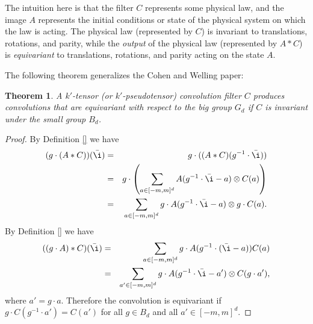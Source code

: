 \documentclass{article}
\theoremstyle{plain}
\newtheorem{theorem}{Theorem}
\begin{document}
The intuition here is that the filter $C$ represents some physical law, and the image $A$ represents the initial conditions or state of the physical system on which the law is acting.
The physical law (represented by $C$) is invariant to translations, rotations, and parity, while the \emph{output} of the physical law (represented by $A\ast C$) is \emph{equivariant} to translations, rotations, and parity acting on the state $A$.

The following theorem generalizes the Cohen and Welling paper:

\begin{theorem}
A $k'$-tensor (or $k'$-pseudotensor) convolution filter $C$ produces convolutions that are equivariant with respect to the big group $G_d$ if $C$ is invariant under the small group $B_d$.
\end{theorem}

\begin{proof}
By Definition \ref{} we have
\begin{eqnarray}
(g\cdot (A* C) )(\bar \i) &=& g\cdot( (A*C)(g^{-1} \cdot \bar \i)) \\
&=& g \cdot \left (\sum_{a\in [-m,m]^d} A(g^{-1}\cdot \bar \i - a) \otimes C(a)\right)\\
&=& \sum_{a\in [-m,m]^d} g \cdot A(g^{-1} \cdot \bar \i -a ) \otimes g \cdot C(a).
\end{eqnarray}
By Definition \ref{} we have
\begin{eqnarray}
((g\cdot A)* C) (\bar \i) &=& \sum_{a\in [-m,m]^d} g\cdot A(g^{-1} \cdot (\bar \i - a) ) C(a) \\
&=& \sum_{a'\in [-m,m]^d} g \cdot A(g^{-1}\cdot \bar \i -a') \otimes C(g\cdot a'),
\end{eqnarray}
where $a'=g\cdot a$. Therefore the convolution is equivariant if $g\cdot C(g^{-1} \cdot a') = C(a')$ for all $g\in B_d$ and all $a' \in [-m,m]^d$. 
\end{proof}
\end{document}

